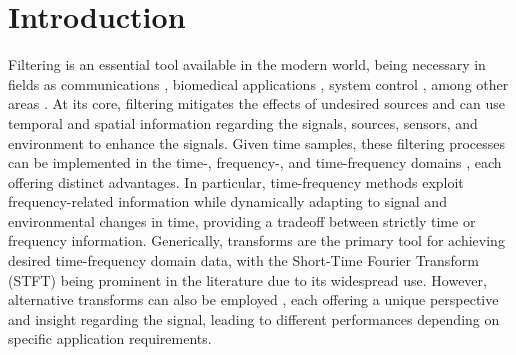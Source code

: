 \section{Introduction}
\label{sec:introduction}


Filtering is an essential tool available in the modern world, being necessary in fields as communications \cite{chen_source_2002}, biomedical applications \cite{lobato_worst-case-optimization_2020,lu_biomedical_1994,nguyen_minimum_2017}, system control \cite{han_comparative_2016,hagglund_signal_2012}, among other areas \cite{hathcock_noise_2016,lee_general_2002,shi_new_2004}. At its core, filtering mitigates the effects of undesired sources and can use temporal and spatial information regarding the signals, sources, sensors, and environment to enhance the signals. Given time samples, these filtering processes can be implemented in the time-, frequency-, and time-frequency domains \cite{benesty_fundamentals_2017}, each offering distinct advantages. In particular, time-frequency methods exploit frequency-related information while dynamically adapting to signal and environmental changes in time, providing a tradeoff between strictly time or frequency information. Generically, transforms are the primary tool for achieving desired time-frequency domain data, with the Short-Time Fourier Transform (STFT) \cite{kiymik_comparison_2005,pan_microphone_2021} being prominent in the literature due to its widespread use. However, alternative transforms can also be employed \cite{chen_wavelet-based_2018,yang_general_2014,almeida_fractional_1994}, each offering a unique perspective and insight regarding the signal, leading to different performances depending on specific application requirements.


